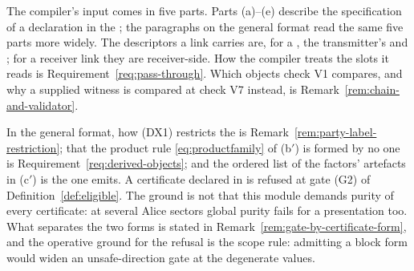 
The compiler's input comes in five parts. Parts (a)--(e) describe the
specification of a declaration in the ; the paragraphs on
the general format read the same five parts more widely. The descriptors a
link carries are, for a , the transmitter's
 and ; for a receiver link
they are receiver-side. How the compiler treats the slots it reads is
Requirement~\ref{req:pass-through}. Which objects check V1 compares, and why
a supplied witness is compared at check V7 instead, is
Remark~\ref{rem:chain-and-validator}.

In the general format, how (DX1) restricts the  is
Remark~\ref{rem:party-label-restriction}; that the product rule
\eqref{eq:productfamily} of (b$'$) is formed by no one is
Requirement~\ref{req:derived-objects}; and the ordered
list of the factors' artefacts in (c$'$) is the one
 emits. A certificate declared in
 is refused at gate (G2) of Definition~\ref{def:eligible}.
The ground is not that this module demands purity of every certificate: at several Alice sectors global purity
fails for a presentation too. What separates the two forms is stated in
Remark~\ref{rem:gate-by-certificate-form}, and the operative ground for the
refusal is the scope rule: admitting a block form would widen an
unsafe-direction gate at the degenerate values.

